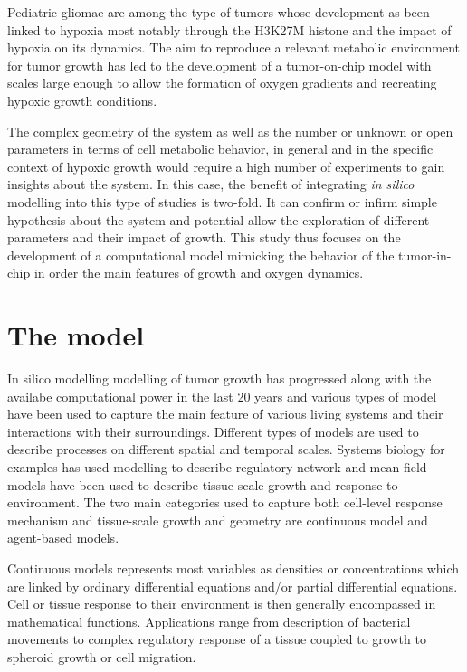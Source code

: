 \documentclass[11pt,a4paper]{article}
\begin{document}
Pediatric gliomae are among the type of tumors whose development as been linked to hypoxia most notably through the H3K27M histone and the impact of hypoxia on its dynamics.\cite{Rakotomalala2021} The aim to reproduce a relevant metabolic environment for tumor growth has led to the development of a tumor-on-chip model with scales large enough to allow the formation of oxygen gradients and recreating hypoxic growth conditions.

The complex geometry of the system as well as the number or unknown or open parameters in terms of cell metabolic behavior, in general and in the specific context of hypoxic growth would require a high number of experiments to gain insights about the system. In this case, the benefit of integrating \textit{in silico} modelling into this type of studies is two-fold. It can confirm or infirm simple hypothesis about the system and potential allow the exploration of different parameters and their impact of growth. This study thus focuses on the development of a computational model mimicking the behavior of the tumor-in-chip in order the main features of growth and oxygen dynamics.

\section{The model}
In silico modelling modelling of tumor growth has progressed along with the availabe computational power in the last 20 years and various types of model have been used to capture the main feature of various living systems and their interactions with their surroundings. Different types of models are used to describe processes on different spatial and temporal scales. Systems biology for examples has used modelling to describe regulatory network and mean-field models have been used to describe tissue-scale growth and response to environment. The two main categories used to capture both cell-level response mechanism and tissue-scale growth and geometry are continuous model and agent-based models. 

Continuous models represents most variables as densities or concentrations which are linked by ordinary differential equations and/or partial differential equations. Cell or tissue response to their environment is then generally encompassed in mathematical functions. Applications range from description of bacterial movements to complex regulatory response of a tissue coupled to growth to spheroid growth or cell migration.\cite{Casciari1992}\cite{Villa2021}\cite{Katsaounis2023}
\end{document}
